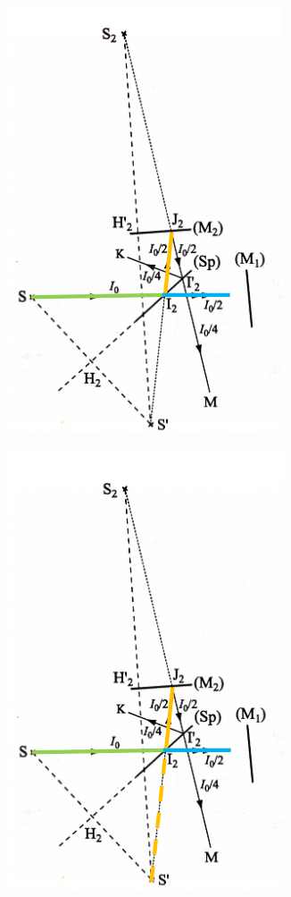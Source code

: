 \documentclass[10pt]{beamer}
\begin{document}
\begin{frame}{\insertsubsection}
    \begin{figure}
        \centering
        \includegraphics[width=.4\textwidth]{M5.png}
    \end{figure}
\end{frame}
\begin{frame}{\insertsubsection}
    \begin{figure}
        \centering
        \includegraphics[width=.4\textwidth]{M6.png}
    \end{figure}
\end{frame}
\end{document}
